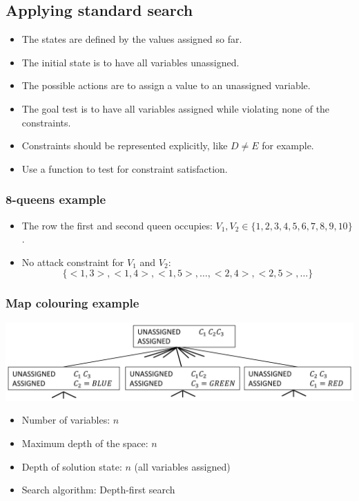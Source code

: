 \documentclass[11pt]{article}
\begin{document}
\subsection{Applying standard search}
\label{sec:org06c5e47}
\begin{itemize}
\item The states are defined by the values assigned so far.
\item The initial state is to have all variables unassigned.
\item The possible actions are to assign a value to an unassigned variable.
\item The goal test is to have all variables assigned while violating none of the constraints.
\item Constraints should be represented explicitly, like \(D \ne E\) for example.
\item Use a function to test for constraint satisfaction.
\end{itemize}
\subsubsection{8-queens example}
\label{sec:orga95b5d6}
\begin{itemize}
\item The row the first and second queen occupies: \(V_1, V_2 \in \{1, 2, 3, 4, 5, 6, 7, 8, 9, 10\}\).
\item No attack constraint for \(V_1\) and \(V_2\):
\[\{<1, 3>, <1, 4>, <1, 5>, \ldots, <2, 4>, <2, 5>, \ldots\}\]
\end{itemize}
\subsubsection{Map colouring example}
\label{sec:orgda59752}
\begin{center}
\includegraphics[width=.9\linewidth]{./images/map-colouring-example-diagram.png}
\end{center}

\begin{itemize}
\item Number of variables: \(n\)
\item Maximum depth of the space: \(n\)
\item Depth of solution state: \(n\) (all variables assigned)
\item Search algorithm: Depth-first search
\end{itemize}
\end{document}
